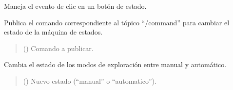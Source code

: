 \documentclass[a4paper,10pt,spanish]{sphinxmanual}
\begin{document}
\begin{fulllineitems}

\begin{fulllineitems}
\label{\detokenize{squad_state_manager:squad_interfaz.InterfazManager.on_state_button_click}}
\pysigstartsignatures
{}
\pysigstopsignatures
\sphinxAtStartPar
Maneja el evento de clic en un botón de estado.

\sphinxAtStartPar
Publica el comando correspondiente al tópico “/command” para cambiar el estado
de la máquina de estados.
\begin{quote}\begin{description}
\sphinxAtStartPar
{} () \textendash{} Comando a publicar.

\end{description}\end{quote}

\end{fulllineitems}


\begin{fulllineitems}
\label{\detokenize{squad_state_manager:squad_interfaz.InterfazManager.set_switch_state}}
\pysigstartsignatures
{}
\pysigstopsignatures
\sphinxAtStartPar
Cambia el estado de los modos de exploración entre manual y automático.
\begin{quote}\begin{description}
\sphinxAtStartPar
{} () \textendash{} Nuevo estado (“manual” o “automatico”).

\end{description}\end{quote}


\end{fulllineitems}
\end{fulllineitems}
\end{document}
